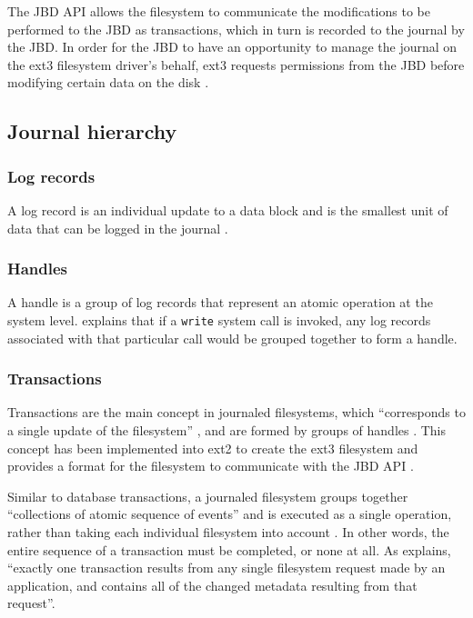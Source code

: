 The JBD API allows the filesystem to communicate the modifications to be performed to the JBD as transactions, which in turn is recorded to the journal by the JBD. In order for the JBD to have an opportunity to manage the journal on the ext3 filesystem driver's behalf, ext3 requests permissions from the JBD before modifying certain data on the disk \citep{Robbins2001a}.

\subsection{Journal hierarchy}

\subsubsection{Log records}

A log record is an individual update to a data block and is the smallest unit of data that can be logged in the journal \citep{Mauerer2008}.

\subsubsection{Handles}

A handle is a group of log records that represent an atomic operation at the system level. \citet[p. 639]{Mauerer2008} explains that if a \texttt{write} system call is invoked, any log records associated with that particular call would be grouped together to form a handle.

\subsubsection{Transactions}

Transactions are the main concept in journaled filesystems, which ``corresponds to a single update of the filesystem'' \citep[p. 4]{Tweedie1998}, and are formed by groups of handles \citep{Mauerer2008}. This concept has been implemented into ext2 to create the ext3 filesystem and provides a format for the filesystem to communicate with the JBD API \citep{Tweedie2000}.

Similar to database transactions, a journaled filesystem groups together ``collections of atomic sequence of events'' and is executed as a single operation, rather than taking each individual filesystem into account \citep[p. 2]{Katiyar2011}. In other words, the entire sequence of a transaction must be completed, or none at all. As \citet[p. 4]{Tweedie2000} explains, ``exactly one transaction results from any single filesystem request made by an application, and contains all of the changed metadata resulting from that request''.


